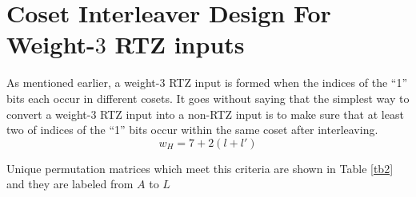 \documentclass[11pt, oneside, dvipdfmx]{book}
\begin{document}




\section{Coset Interleaver Design For Weight-$3$ RTZ inputs}
As mentioned earlier, a weight-$3$ RTZ input is formed when the indices of the ``1'' bits each occur in different cosets.  It goes without saying that the simplest way to convert a weight-$3$ RTZ input into a non-RTZ input is to make sure that at least two of indices of the ``1'' bits occur within the same coset after interleaving.
\begin{equation}
w_H=
7+2(l+l') 
\label{eq6}
\end{equation}



Unique permutation matrices which meet this criteria are shown in Table \ref{tb2} and they are labeled from $A$ to $L$
\end{document}
